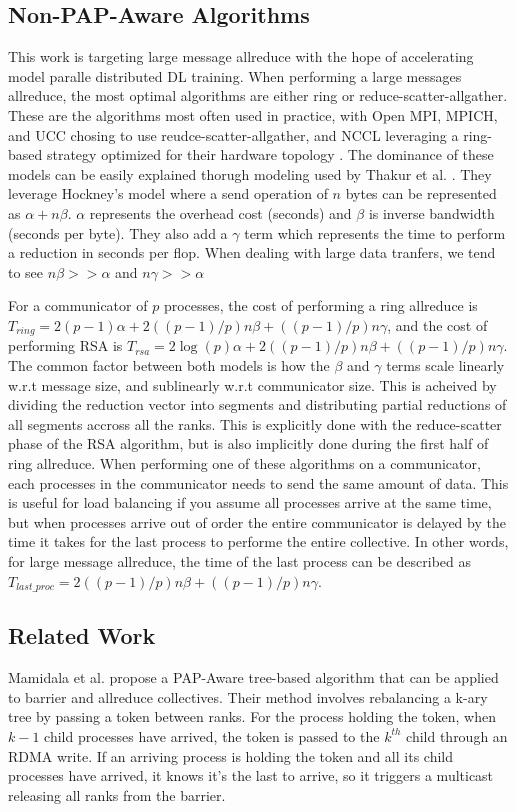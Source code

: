 \subsection{Non-PAP-Aware Algorithms} %
This work is targeting large message allreduce with the hope of accelerating model paralle distributed DL training.
When performing a large messages allreduce, the most optimal algorithms are either ring or reduce-scatter-allgather.
These are the algorithms most often used in practice, with Open MPI, MPICH, and UCC chosing to use reudce-scatter-allgather, and NCCL leveraging a ring-based strategy optimized for their hardware topology \cite{gabriel2004OpenMPI, MPICH, UCC, NCCL}.
The dominance of these models can be easily explained thorugh modeling used by Thakur et al. \cite{Thakur2005OptMPICH}.
They leverage Hockney's model \cite{Hockney1994HockenyModel} where a send operation of $n$ bytes can be represented as $\alpha+n\beta$.
$\alpha$ represents the overhead cost (seconds) and $\beta$ is inverse bandwidth (seconds per byte).
They also add a $\gamma$ term which represents the time to perform a reduction in seconds per flop. 
When dealing with large data tranfers, we tend to see $n\beta>>\alpha$ and $n\gamma>>\alpha$ 

For a communicator of $p$ processes, the cost of performing a ring allreduce is $T_{ring} = 2(p-1)\alpha + 2((p-1)/p)n\beta + ((p-1)/p)n\gamma$, and the cost of performing RSA is $T_{rsa} = 2\log(p)\alpha + 2((p-1)/p)n\beta + ((p-1)/p)n\gamma$.
The common factor between both models is how the $\beta$ and $\gamma$ terms scale linearly w.r.t message size, and sublinearly w.r.t communicator size.
This is acheived by dividing the reduction vector into segments and distributing partial reductions of all segments accross all the ranks.
This is explicitly done with the reduce-scatter phase of the RSA algorithm, but is also implicitly done during the first half of ring allreduce.
When performing one of these algorithms on a communicator, each processes in the communicator needs to send the same amount of data.
This is useful for load balancing if you assume all processes arrive at the same time, but when processes arrive out of order the entire communicator is delayed by the time it takes for the last process to performe the entire collective.
In other words, for large message allreduce, the time of the last process can be described as $T_{last\_proc}=2((p-1)/p)n\beta + ((p-1)/p)n\gamma$.

\subsection{Related Work}
Mamidala et al. \cite{Mamidala2004BarrierAllreduceIBAdaptive} propose a PAP-Aware tree-based algorithm that can be applied to barrier and allreduce collectives.
Their method involves rebalancing a k-ary tree by passing a token between ranks.
For the process holding the token, when $k-1$ child processes have arrived, the token is passed to the $k^{th}$ child through an RDMA write.
If an arriving process is holding the token and all its child processes have arrived, it knows it's the last to arrive, so it triggers a multicast releasing all ranks from the barrier. 

